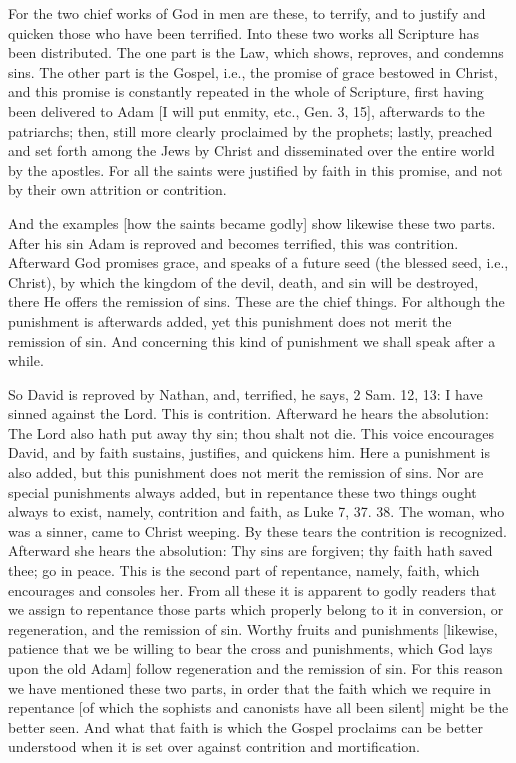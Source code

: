 For the two chief works of God in men are these, to terrify, and to
justify and quicken those who have been terrified.  Into these two
works all Scripture has been distributed.  The one part is the Law,
which shows, reproves, and condemns sins.  The other part is the
Gospel, i.e., the promise of grace bestowed in Christ, and this
promise is constantly repeated in the whole of Scripture, first
having been delivered to Adam [I will put enmity, etc., Gen. 3, 15],
afterwards to the patriarchs; then, still more clearly proclaimed by
the prophets; lastly, preached and set forth among the Jews by Christ
and disseminated over the entire world by the apostles.  For all the
saints were justified by faith in this promise, and not by their own
attrition or contrition.

And the examples [how the saints became godly] show likewise these
two parts.  After his sin Adam is reproved and becomes terrified,
this was contrition.  Afterward God promises grace, and speaks of a
future seed (the blessed seed, i.e., Christ), by which the kingdom of
the devil, death, and sin will be destroyed, there He offers the
remission of sins.  These are the chief things.  For although the
punishment is afterwards added, yet this punishment does not merit
the remission of sin.  And concerning this kind of punishment we
shall speak after a while.

So David is reproved by Nathan, and, terrified, he says, 2 Sam. 12,
13: I have sinned against the Lord.  This is contrition.  Afterward
he hears the absolution: The Lord also hath put away thy sin; thou
shalt not die.  This voice encourages David, and by faith sustains,
justifies, and quickens him.  Here a punishment is also added, but
this punishment does not merit the remission of sins.  Nor are
special punishments always added, but in repentance these two things
ought always to exist, namely, contrition and faith, as Luke 7, 37.
38. The woman, who was a sinner, came to Christ weeping.  By these
tears the contrition is recognized.  Afterward she hears the
absolution: Thy sins are forgiven; thy faith hath saved thee; go in
peace.  This is the second part of repentance, namely, faith, which
encourages and consoles her.  From all these it is apparent to godly
readers that we assign to repentance those parts which properly
belong to it in conversion, or regeneration, and the remission of sin.
Worthy fruits and punishments [likewise, patience that we be
willing to bear the cross and punishments, which God lays upon the
old Adam] follow regeneration and the remission of sin.  For this
reason we have mentioned these two parts, in order that the faith
which we require in repentance [of which the sophists and canonists
have all been silent] might be the better seen.  And what that faith
is which the Gospel proclaims can be better understood when it is set
over against contrition and mortification.

